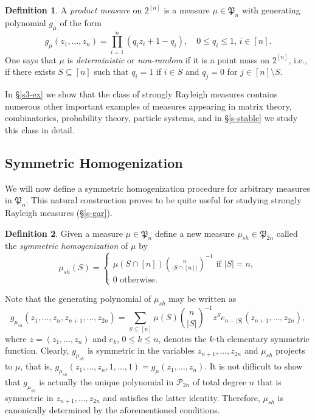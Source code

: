 \documentclass[10pt,reqno]{amsart}
\theoremstyle{plain}
\theoremstyle{definition}
\newtheorem{definition}{Definition}[section]
\theoremstyle{remark}
\newcommand{\PP}{\mathcal{P}}
\newcommand{\fP}{\mathfrak{P}}
\begin{document}
\begin{definition}\label{d-prod-m}
A {\em product measure} on $2^{[n]}$
is a measure $\mu\in\fP_n$ with generating polynomial $g_\mu$ of the form
$$g_\mu(z_1,\ldots,z_n)
=\prod_{i=1}^{n}(q_iz_i+1-q_i),\quad 0\leq q_i\leq 1,\,i\in [n].$$
One says that $\mu$ is
{\em deterministic} or {\em non-random} if it is a point mass
on $2^{[n]}$, i.e., if there exists $S\subseteq [n]$ such that
$q_i=1$ if $i\in S$ and $q_j=0$ for  
$j\in [n]\setminus S$.
\end{definition}

In \S \ref{s3-ex} we show that the class of strongly Rayleigh measures 
contains numerous other 
important examples of measures appearing in matrix theory,
combinatorics, probability theory, particle systems, 
and in \S \ref{s-stable} we study this class in detail. 

\subsection{Symmetric Homogenization}\label{s22}
We will now define a symmetric homogenization 
procedure for arbitrary measures in $\fP_n$. This natural construction 
proves to be quite useful for studying strongly Rayleigh measures 
(\S \ref{s-gar}).

\begin{definition}\label{d-sh}
Given a measure $\mu\in\fP_n$ define a new measure $\mu_{sh}\in\fP_{2n}$ 
called the {\em symmetric homogenization} of $\mu$ by
$$
\mu_{sh}(S) = 
\begin{cases}
\mu(S\cap[n])\binom{n}{|S\cap [n]|}^{-1} \mbox{ if } |S|=n, \\
0 \mbox{ otherwise. } 
\end{cases} 
$$
\end{definition}

Note that the generating polynomial of $\mu_{sh}$ may be written as
$$g_{\mu_{sh}}(z_1,\ldots,z_n,z_{n+1},\ldots,z_{2n})=
\sum_{S \subseteq [n]} \mu(S)\binom{n}{|S|}^{-1} z^S 
e_{n-|S|}(z_{n+1},\ldots, z_{2n}),
$$
where $z=(z_1,\ldots,z_n)$ and $e_k$, $0\le k\le n$, denotes the $k$-th 
elementary symmetric function. Clearly, $g_{\mu_{sh}}$ is symmetric in the 
variables $z_{n+1},\ldots,z_{2n}$ and $\mu_{sh}$ projects to $\mu$, that is,
$g_{\mu_{sh}}(z_1,\ldots,z_n,1,\ldots,1)=g_{\mu}(z_1,\ldots,z_n)$. It is not 
difficult to show that 
$g_{\mu_{sh}}$ is actually the unique polynomial
in $\PP_{2n}$ of total degree $n$ that is 
symmetric in $z_{n+1},\ldots,z_{2n}$ and satisfies the latter identity. 
Therefore, $\mu_{sh}$ is canonically 
determined by the aforementioned conditions.
\end{document}
